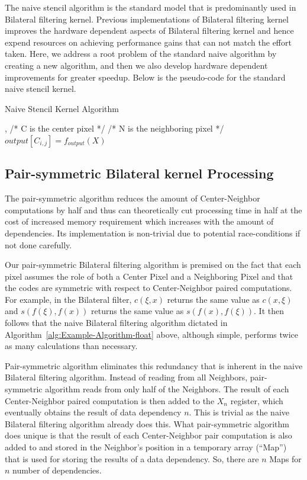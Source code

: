 \documentclass{IEEEtran}
\begin{document}
The naive stencil algorithm is the standard model that is predominantly used in Bilateral filtering kernel. Previous implementations\cite{Paris2009,Pham2005} of Bilateral filtering kernel improves the hardware dependent aspects of Bilateral filtering kernel and hence expend resources on achieving performance gains that can not match the effort taken. Here, we address a root problem of the standard naive algorithm by creating a new algorithm, and then we also develop hardware dependent improvements for greater speedup. Below is the pseudo-code for the standard naive stencil kernel.

\begin{algorithm}[!h]
\caption{\label{alg:Example-Algorithm-float}Naive Stencil Kernel Algorithm}
\begin{algorithmic}
, /* C is the center pixel */
\STATE /* N is the neighboring pixel */
\ENDFOR
\ENDFOR
\ENDFOR
\ENDFOR
\STATE $output[C_{i,j}] = f_{output}(X)$
\end{algorithmic}
\end{algorithm}

\subsection{Pair-symmetric Bilateral kernel Processing}
The pair-symmetric algorithm reduces the amount of Center-Neighbor computations by half and thus can theoretically cut processing time in half at the cost of increased memory requirement which increases with the amount of dependencies. Its implementation is non-trivial due to potential race-conditions if not done carefully.

Our pair-symmetric Bilateral filtering algorithm is premised on the fact that each pixel assumes the role of both a Center Pixel and a Neighboring Pixel and that the codes are symmetric with respect to Center-Neighbor paired computations. For example, in the Bilateral filter, $c(\xi,x)$ returns the same value as $c(x,\xi)$ and $s(f(\xi),f(x))$ returns the same value as $s(f(x),f(\xi))$. It then follows that the naive Bilateral filtering algorithm dictated in Algorithm~\ref{alg:Example-Algorithm-float} above, although simple, performs twice as many calculations than necessary.

Pair-symmetric algorithm eliminates this redundancy that is inherent in the naive Bilateral filtering algorithm. Instead of reading from all Neighbors, pair-symmetric algorithm reads from only half of the Neighbors. The result of each Center-Neighbor paired computation is then added to the $X_n$ register, which eventually obtains the result of data dependency $n$. This is trivial as the naive Bilateral filtering algorithm already does this. What pair-symmetric algorithm does unique is that the result of each Center-Neighbor pair computation is also added to and stored in the Neighbor's position in a temporary array (``Map'') that is used for storing the results of a data dependency. So, there are $n$ Maps for $n$ number of dependencies. 
\end{document}

